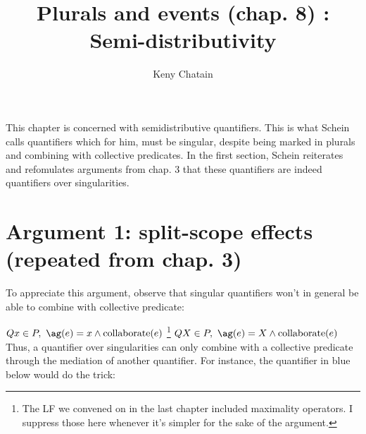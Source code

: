 





\endofdump

\newcommand{\scale}{1}

\title{Plurals and events (chap. 8) : Semi-distributivity}
\author{Keny Chatain}


\maketitle

This chapter is concerned with semidistributive quantifiers. This is what Schein calls quantifiers which for him, must be singular, despite being marked in plurals and combining with collective predicates. In the first section, Schein reiterates and refomulates arguments from chap. 3 that these quantifiers are indeed quantifiers over singularities.

\section{Argument 1: split-scope effects (repeated from chap. 3)}

To appreciate this argument, observe that singular quantifiers won't in general be able to combine with collective predicate:

\pex \label{two_case}
\a 
\ljudge* $Q x\in P,\ \ag(e) = x \wedge \text{collaborate}(e)$
\footnote{
The LF we convened on in the last chapter included maximality operators. I suppress those here whenever it's simpler for the sake of the argument.
}
\a 
\ljudge{$\checkmark$} $Q X\in P,\ \ag(e) = X \wedge \text{collaborate}(e)$
\xe
%
Thus, a quantifier over singularities can only combine with a collective predicate through the mediation of another quantifier. For instance, the quantifier in {\bg blue} below would do the trick:

